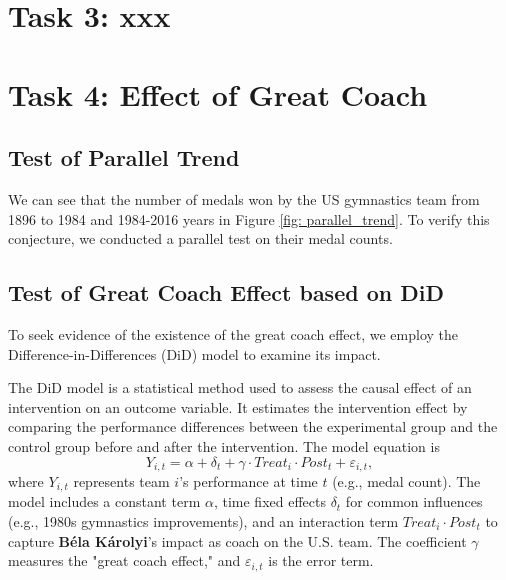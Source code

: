 \documentclass{mcmthesis}
\begin{document}
	
	
	
	
	
	
	
	
	
	
	
	
	\section{Task 3: xxx}
	
	
\section{Task 4: Effect of Great Coach}
	

	
\subsection{Test of Parallel Trend }

We can see that the number of medals won by the US gymnastics team from 1896 to 1984 and 1984-2016 years in Figure \ref{fig: parallel_trend}. To verify this conjecture, we conducted a parallel test on their medal counts.


\subsection{Test of Great Coach Effect based on DiD}

To seek evidence of the existence of the great coach effect, we employ the Difference-in-Differences (DiD) model to examine its impact.

The DiD model is a statistical method used to assess the causal effect of an intervention on an outcome variable. It estimates the intervention effect by comparing the performance differences between the experimental group and the control group before and after the intervention. The model equation is 
\begin{equation}
Y_{i,t}=\alpha+\delta_t+\gamma \cdot Treat_i \cdot Post_t + \varepsilon_{i,t},
\end{equation}
where \( Y_{i,t} \) represents team \( i \)'s performance at time \( t \) (e.g., medal count). The model includes a constant term \(\alpha\), time fixed effects \(\delta_t\) for common influences (e.g., 1980s gymnastics improvements), and an interaction term \( Treat_i \cdot Post_t \) to capture \textbf{Béla Károlyi}'s impact as coach on the U.S. team. The coefficient \(\gamma\) measures the "great coach effect," and \(\varepsilon_{i,t}\) is the error term.
\end{document}
